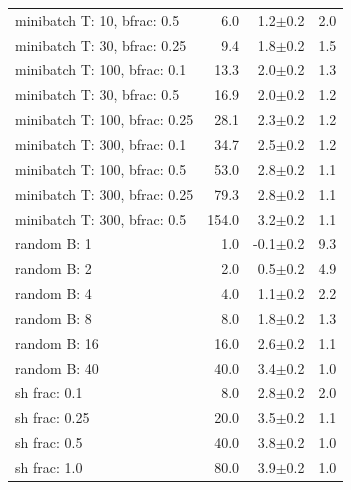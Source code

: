 \begin{tabular}{lrrr}
minibatch T: 10, bfrac: 0.5 & 6.0 & 1.2$\pm$0.2 & 2.0 \\
minibatch T: 30, bfrac: 0.25 & 9.4 & 1.8$\pm$0.2 & 1.5 \\
minibatch T: 100, bfrac: 0.1 & 13.3 & 2.0$\pm$0.2 & 1.3 \\
minibatch T: 30, bfrac: 0.5 & 16.9 & 2.0$\pm$0.2 & 1.2 \\
minibatch T: 100, bfrac: 0.25 & 28.1 & 2.3$\pm$0.2 & 1.2 \\
minibatch T: 300, bfrac: 0.1 & 34.7 & 2.5$\pm$0.2 & 1.2 \\
minibatch T: 100, bfrac: 0.5 & 53.0 & 2.8$\pm$0.2 & 1.1 \\
minibatch T: 300, bfrac: 0.25 & 79.3 & 2.8$\pm$0.2 & 1.1 \\
minibatch T: 300, bfrac: 0.5 & 154.0 & 3.2$\pm$0.2 & 1.1 \\
random B: 1 & 1.0 & -0.1$\pm$0.2 & 9.3 \\
random B: 2 & 2.0 & 0.5$\pm$0.2 & 4.9 \\
random B: 4 & 4.0 & 1.1$\pm$0.2 & 2.2 \\
random B: 8 & 8.0 & 1.8$\pm$0.2 & 1.3 \\
random B: 16 & 16.0 & 2.6$\pm$0.2 & 1.1 \\
random B: 40 & 40.0 & 3.4$\pm$0.2 & 1.0 \\
sh frac: 0.1 & 8.0 & 2.8$\pm$0.2 & 2.0 \\
sh frac: 0.25 & 20.0 & 3.5$\pm$0.2 & 1.1 \\
sh frac: 0.5 & 40.0 & 3.8$\pm$0.2 & 1.0 \\
sh frac: 1.0 & 80.0 & 3.9$\pm$0.2 & 1.0 \\
\bottomrule
\end{tabular}
